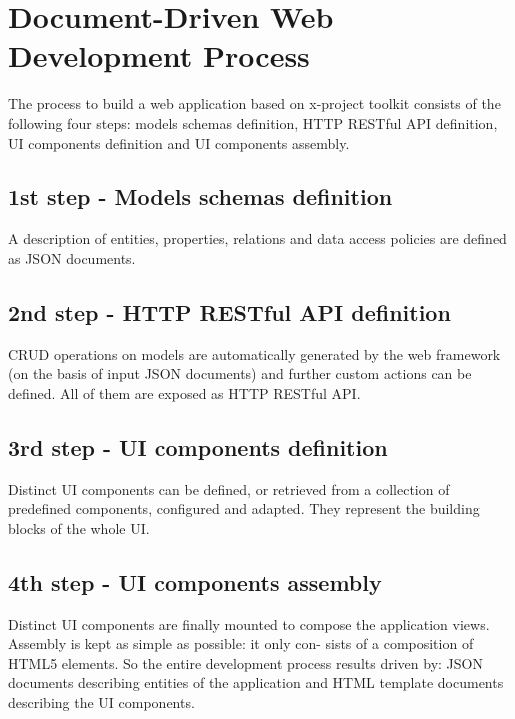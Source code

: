 \section{Document-Driven Web Development Process}
\label{sec:XPR_flow}

The process to build a web application based on x-project toolkit consists of the following four steps: models schemas definition, HTTP RESTful API definition, UI components definition and UI components assembly.

\subsection{1st step - Models schemas definition}
\label{sec:XPR_flow_first}
A description of entities, properties, relations and data access policies are defined as JSON documents.

\subsection{2nd step - HTTP RESTful API definition}
\label{sec:XPR_flow_sec}
CRUD operations on models are automatically generated by the web framework (on the basis of input JSON documents) and further custom actions can be defined. All of them are exposed as HTTP RESTful API.

\subsection{3rd step - UI components definition}
\label{sec:XPR_flow_third}
Distinct UI components can be defined, or retrieved from a collection of predefined components, configured and adapted. They represent the building blocks of the whole UI.

\subsection{4th step - UI components assembly}
\label{sec:XPR_flow_third}
Distinct UI components are finally mounted to compose the application views. Assembly is kept as simple as possible: it only con- sists of a composition of HTML5 elements.
So the entire development process results driven by: JSON documents describing entities of the application and HTML template documents describing the UI components.

